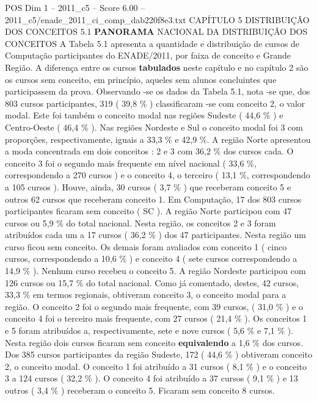 \begin{textsample}{POS Dim 1 – 2011\_c5 – Score 6.00 – 2011\_c5/enade\_2011\_ci\_comp\_dab220f8e3.txt}  \label{ex:f1_pos_123}
CAPÍTULO 5 DISTRIBUIÇÃO DOS CONCEITOS 5.1 \textbf{PANORAMA} NACIONAL DA DISTRIBUIÇÃO DOS CONCEITOS A Tabela 5.1 apresenta a quantidade e distribuição de cursos de Computação participantes do ENADE/2011, por faixa de conceito e Grande Região.
A diferença entre os cursos \textbf{tabulados} neste capítulo e no capítulo 2 são os cursos sem conceito, em princípio, aqueles sem alunos concluintes que participassem da prova.
Observando -se os dados da Tabela 5.1, nota -se que, dos 803 cursos participantes, 319 ( 39,8 \% ) classificaram -se com conceito 2, o valor modal.
Este foi também o conceito modal nas regiões Sudeste ( 44,6 \% ) e Centro-Oeste ( 46,4 \% ).
Nas regiões Nordeste e Sul o conceito modal foi 3 com proporções, respectivamente, iguais a 33,3 \% e 42,9 \%.
A região Norte apresentou a moda concentrada em dois conceitos : 2 e 3 com 36,2 \% dos cursos cada.
O conceito 3 foi o segundo mais frequente em nível nacional ( 33,6 \%, correspondendo a 270 cursos ) e o conceito 4, o terceiro ( 13,1 \%, correspondendo a 105 cursos ).
Houve, ainda, 30 cursos ( 3,7 \% ) que receberam conceito 5 e outros 62 cursos que receberam conceito 1.
Em Computação, 17 dos 803 cursos participantes ficaram sem conceito ( SC ).
A região Norte participou com 47 cursos ou 5,9 \% do total nacional.
Nesta região, os conceitos 2 e 3 foram atribuídos cada um a 17 cursos ( 36,2 \% ) dos 47 participantes.
Nesta região um curso ficou sem conceito.
Os demais foram avaliados com conceito 1 ( cinco cursos, correspondendo a 10,6 \% ) e conceito 4 ( sete cursos correspondendo a 14,9 \% ).
Nenhum curso recebeu o conceito 5.
A região Nordeste participou com 126 cursos ou 15,7 \% do total nacional.
Como já comentado, destes, 42 cursos, 33,3 \% em termos regionais, obtiveram conceito 3, o conceito modal para a região.
O conceito 2 foi o segundo mais frequente, com 39 cursos, ( 31,0 \% ) e o conceito 4 foi o terceiro mais frequente, com 27 cursos ( 21,4 \% ).
Os conceitos 1 e 5 foram atribuídos a, respectivamente, sete e nove cursos ( 5,6 \% e 7,1 \% ).
Nesta região dois cursos ficaram sem conceito \textbf{equivalendo} a 1,6 \% dos cursos.
Dos 385 cursos participantes da região Sudeste, 172 ( 44,6 \% ) obtiveram conceito 2, o conceito modal.
O conceito 1 foi atribuído a 31 cursos ( 8,1 \% ) e o conceito 3 a 124 cursos ( 32,2 \% ).
O conceito 4 foi atribuído a 37 cursos ( 9,1 \% ) e 13 outros ( 3,4 \% ) receberam o conceito 5.
Ficaram sem conceito 8 cursos.

\end{textsample}
